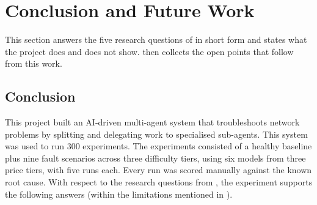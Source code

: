 \section{Conclusion and Future Work}
\label{sec:conclusion}

This section answers the five research questions of
 in short form and states what the project does and does not show.
 then collects the open points that follow from this work. 

\subsection{Conclusion}
\label{sec:conclusion-summary}

This project built an AI-driven multi-agent system that troubleshoots network problems by
splitting and delegating work to specialised sub-agents. This system was used to
run 300 experiments. The experiments consisted of a healthy baseline plus nine fault scenarios across
three difficulty tiers, using six models from three price tiers, with five runs each. Every run was scored manually against the known root cause.
With respect to the research questions from , the experiment
supports the following answers (within the limitations mentioned in ).


